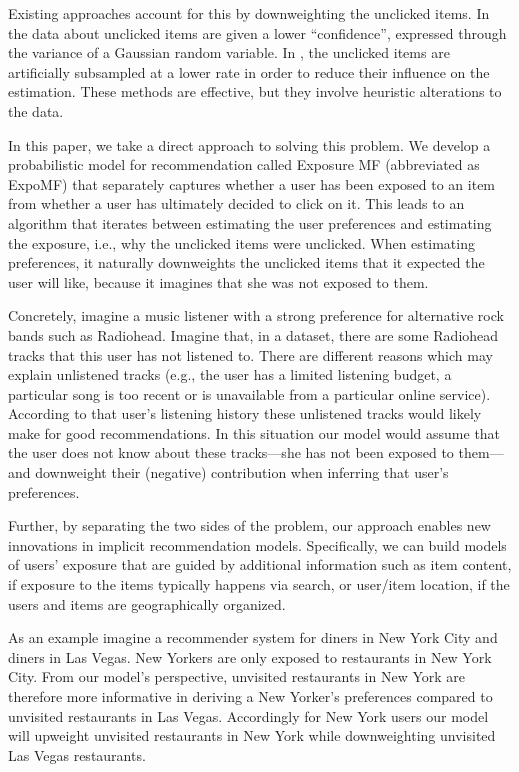 Existing approaches account for this by downweighting the unclicked
items.  In \citet{hu2008collaborative} the data about unclicked items are given a
lower ``confidence'', expressed through the variance of a Gaussian
random variable.  In \citet{rendle2009bpr}, the unclicked items are artificially
subsampled at a lower rate in order to reduce their influence on the
estimation.  These methods are effective, but they involve heuristic
alterations to the data.

In this paper, we take a direct approach to solving this problem.  We
develop a probabilistic model for recommendation called Exposure MF
(abbreviated as ExpoMF) that separately captures whether a user has been exposed to an item from
whether a user has ultimately decided to click on it.  This leads to an
algorithm that iterates between estimating the user preferences and
estimating the exposure, i.e., why the unclicked items were unclicked.
When estimating preferences, it naturally downweights the unclicked items
that it expected the user will like, because it imagines that she was not
exposed to them. 

Concretely, imagine a music listener with a strong preference for alternative
rock bands such as Radiohead. Imagine that, in a dataset, there are some
Radiohead tracks that this user has not listened to. There are different
reasons which may explain unlistened tracks  (e.g., the user has a limited
listening budget, a particular song is too recent or is unavailable from a
particular online service). According to that user's listening history these
unlistened tracks would likely make for good recommendations. In this situation
our model would assume that the user does not know about these tracks---she has
not been exposed to them---and downweight their (negative) contribution when
inferring that user's preferences.

Further, by separating the two sides of the problem, our approach
enables new innovations in implicit recommendation
models. Specifically, we can build models of users' exposure that
are guided by additional information such as item content, if
exposure to the items typically happens via search, or user/item
location, if the users and items are geographically organized.  

As an example imagine a recommender system for diners in New York City and
diners in Las Vegas. New Yorkers are only exposed to restaurants in New York City.
From our model's perspective, unvisited restaurants in New York are therefore more 
informative in deriving a New Yorker's preferences compared to unvisited 
restaurants in Las Vegas. Accordingly for New York users our model will
upweight unvisited restaurants in New York while downweighting unvisited
Las Vegas restaurants. 

